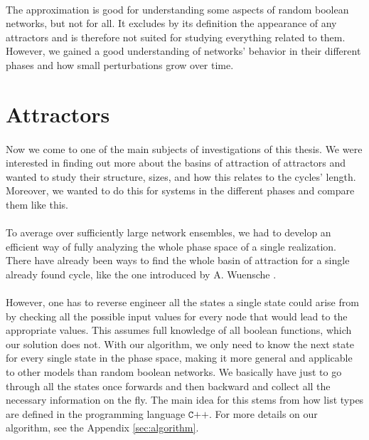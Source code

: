 \paragraph*{}
The approximation is good for understanding some aspects of random boolean networks, but not for all. It excludes by its definition the appearance of any attractors and is therefore not suited for studying everything related to them. However, we gained a good understanding of networks' behavior in their different phases and how small perturbations grow over time.

\section{Attractors}

\paragraph*{}
Now we come to one of the main subjects of investigations of this thesis. We were interested in finding out more about the basins of attraction of attractors and wanted to study their structure, sizes, and how this relates to the cycles' length. Moreover, we wanted to do this for systems in the different phases and compare them like this.

\paragraph*{}
To average over sufficiently large network ensembles, we had to develop an efficient way of fully analyzing the whole phase space of a single realization. There have already been ways to find the whole basin of attraction for a single already found cycle, like the one introduced by A. Wuensche \cite{wuensche1997attractor}. 

\paragraph*{}
However, one has to reverse engineer all the states a single state could arise from by checking all the possible input values for every node that would lead to the appropriate values. This assumes full knowledge of all boolean functions, which our solution does not. With our algorithm, we only need to know the next state for every single state in the phase space, making it more general and applicable to other models than random boolean networks. We basically have just to go through all the states once forwards and then backward and collect all the necessary information on the fly. The main idea for this stems from how list types are defined in the programming language $\texttt{C++}$. For more details on our algorithm, see the Appendix \ref{sec:algorithm}.

